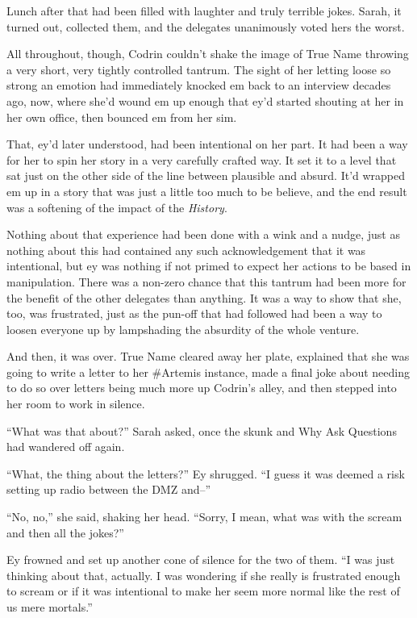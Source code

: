 Lunch after that had been filled with laughter and truly terrible jokes. Sarah, it turned out, collected them, and the delegates unanimously voted hers the worst.

All throughout, though, Codrin couldn't shake the image of True Name throwing a very short, very tightly controlled tantrum. The sight of her letting loose so strong an emotion had immediately knocked em back to an interview decades ago, now, where she'd wound em up enough that ey'd started shouting at her in her own office, then bounced em from her sim.

That, ey'd later understood, had been intentional on her part. It had been a way for her to spin her story in a very carefully crafted way. It set it to a level that sat just on the other side of the line between plausible and absurd. It'd wrapped em up in a story that was just a little too much to be believe, and the end result was a softening of the impact of the \emph{History}.

Nothing about that experience had been done with a wink and a nudge, just as nothing about this had contained any such acknowledgement that it was intentional, but ey was nothing if not primed to expect her actions to be based in manipulation. There was a non-zero chance that this tantrum had been more for the benefit of the other delegates than anything. It was a way to show that she, too, was frustrated, just as the pun-off that had followed had been a way to loosen everyone up by lampshading the absurdity of the whole venture.

And then, it was over. True Name cleared away her plate, explained that she was going to write a letter to her \#Artemis instance, made a final joke about needing to do so over letters being much more up Codrin's alley, and then stepped into her room to work in silence.

``What was that about?'' Sarah asked, once the skunk and Why Ask Questions had wandered off again.

``What, the thing about the letters?'' Ey shrugged. ``I guess it was deemed a risk setting up radio between the DMZ and--''

``No, no,'' she said, shaking her head. ``Sorry, I mean, what was with the scream and then all the jokes?''

Ey frowned and set up another cone of silence for the two of them. ``I was just thinking about that, actually. I was wondering if she really is frustrated enough to scream or if it was intentional to make her seem more normal like the rest of us mere mortals.''

